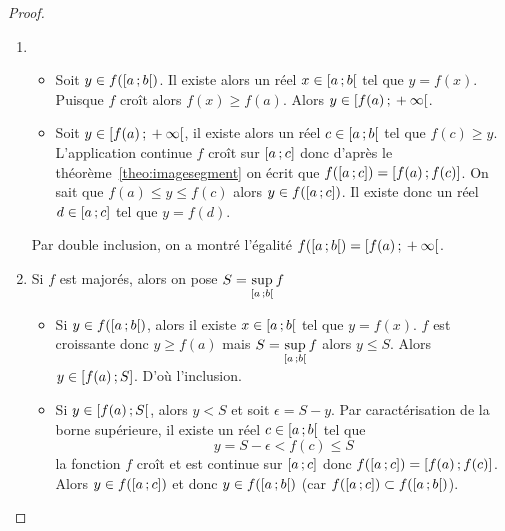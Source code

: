 \begin{proof}
  \begin{enumerate}
    \item
      \begin{itemize}
        \item Soit \(y \in f(\left[ a \, ; {} b \right[)\). Il existe alors un réel \(x
          \in \left[ a \, ; {} b \right[\) tel que \(y=f(x)\). Puisque \(f\) croît
          alors \(f(x) \geqslant f(a)\). Alors \(y \in
          \left[ f(a) \, ; {} +\infty \right[\).
        \item Soit \(y \in \left[ f(a) \, ; {} +\infty \right[\), il existe alors un
          réel \(c \in \left[ a \, ; {} b \right[\) tel que \(f(c) \geqslant y\).
          L'application continue \(f\) croît sur \(\left[ a \, ; {} c \right]\) donc
          d'après le théorème~\ref{theo:imagesegment} on écrit que
          \(f(\left[ a \, ; {} c \right])=\left[ f(a) \, ; {} f(c) \right]\). On sait que
          \(f(a) \le y \leqslant f(c)\) alors \(y \in f(\left[ a \, ; {} c \right])\).
          Il existe donc un réel \(d \in \left[ a \, ; {} c \right]\) tel que
          \(y=f(d)\).
      \end{itemize}
      Par double inclusion, on a montré l'égalité
      \(f(\left[ a \, ; {} b \right[)=\left[ f(a) \, ; {} +\infty \right[\).
    \item Si \(f\) est majorés, alors on pose
      \(S=\sup\limits_{\left[ a \, ; {} b \right[}f\)
      \begin{itemize}
        \item Si \(y \in f(\left[ a \, ; {} b \right[)\), alors il existe \(x \in
          \left[ a \, ; {} b \right[\) tel que \(y=f(x)\). \(f\) est croissante donc
          \(y \geqslant f(a)\) mais \(S=\sup\limits_{\left[ a \, ; {} b \right[}f\)
          alors \(y \leqslant S\). Alors \(y \in \left[ f(a) \, ; {} S \right]\). D'où
          l'inclusion.
        \item Si \(y \in \left[ f(a) \, ; {} S \right[\), alors \(y < S\) et soit
          \(\epsilon=S-y\). Par caractérisation de la borne supérieure, il
          existe un réel \(c \in \left[ a \, ; {} b \right[\) tel que
          \begin{equation}
            y=S-\epsilon < f(c) \leqslant S
          \end{equation}
          la fonction \(f\) croît et est continue sur \(\left[ a \, ; {} c \right]\)
          donc \(f(\left[ a \, ; {} c \right])=\left[ f(a) \, ; {} f(c) \right]\). Alors \(y
          \in f(\left[ a \, ; {} c \right])\) et donc \(y \in f(\left[ a \, ; {} b \right[)\)
          (car \(f(\left[ a \, ; {} c \right]) \subset f(\left[ a \, ; {} b \right[)\)).
      \end{itemize}

\end{enumerate}
\end{proof}

